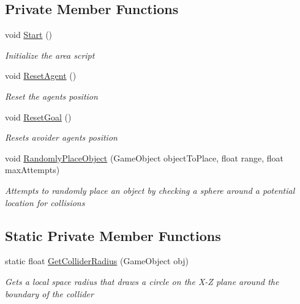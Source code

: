 \subsection*{Private Member Functions}
\begin{DoxyCompactItemize}
\item 
void \mbox{\hyperlink{class_agent_area_a0a2c9d32291c1ec805a5e1f87c1f3edb}{Start}} ()
\begin{DoxyCompactList}\small\item\em Initialize the area script \end{DoxyCompactList}\item 
void \mbox{\hyperlink{class_agent_area_a57cb9e3a0252d4d9d013f74df2413d7d}{Reset\+Agent}} ()
\begin{DoxyCompactList}\small\item\em Reset the agents position \end{DoxyCompactList}\item 
void \mbox{\hyperlink{class_agent_area_aa575658613c279698f0edd6e75773f49}{Reset\+Goal}} ()
\begin{DoxyCompactList}\small\item\em Resets avoider agents position \end{DoxyCompactList}\item 
void \mbox{\hyperlink{class_agent_area_a3f231325630d34930e330cff5e486266}{Randomly\+Place\+Object}} (Game\+Object object\+To\+Place, float range, float max\+Attempts)
\begin{DoxyCompactList}\small\item\em Attempts to randomly place an object by checking a sphere around a potential location for collisions \end{DoxyCompactList}\end{DoxyCompactItemize}
\subsection*{Static Private Member Functions}
\begin{DoxyCompactItemize}
\item 
static float \mbox{\hyperlink{class_agent_area_a7dc794f33c82a1c00914d3171e73d034}{Get\+Collider\+Radius}} (Game\+Object obj)
\begin{DoxyCompactList}\small\item\em Gets a local space radius that draws a circle on the X-\/Z plane around the boundary of the collider \end{DoxyCompactList}\end{DoxyCompactItemize}

